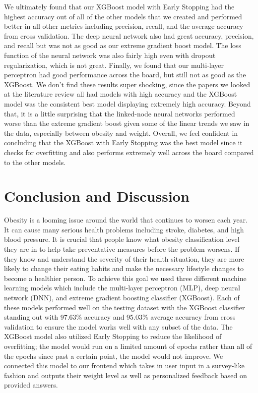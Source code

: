 \documentclass[11pt]{article}
\begin{document}
    We ultimately found that our XGBoost model with Early Stopping had the highest accuracy out of all of the other models that we created and performed better in all other metrics including precision, recall, and the average accuracy from cross validation. The deep neural network also had great accuracy, precision, and recall but was not as good as our extreme gradient boost model. The loss function of the neural network was also fairly high even with dropout regularization, which is not great. Finally, we found that our multi-layer perceptron had good performance across the board, but still not as good as the XGBoost. We don’t find these results super shocking, since the papers we looked at the literature review all had models with high accuracy and the XGBoost model was the consistent best model displaying extremely high accuracy. Beyond that, it is a little surprising that the linked-node neural networks performed worse than the extreme gradient boost given some of the linear trends we saw in the data, especially between obesity and weight. Overall, we feel confident in concluding that the XGBoost with Early Stopping was the best model since it checks for overfitting and also performs extremely well across the board compared to the other models. 
\section{Conclusion and Discussion}
Obesity is a looming issue around the world that continues to worsen each year. It can cause many serious health problems including stroke, diabetes, and high blood pressure. It is crucial that people know what obesity classification level they are in to help take preventative measures before the problem worsens. If they know and understand the severity of their health situation, they are more likely to change their eating habits and make the necessary lifestyle changes to become a healthier person. To achieve this goal we used three different machine learning models which include the multi-layer perceptron (MLP), deep neural network (DNN), and extreme gradient boosting classifier (XGBoost). Each of these models performed well on the testing dataset with the XGBoost classifier standing out with 97.63\% accuracy and 95.03\% average accuracy from cross validation to ensure the model works well with any subset of the data. The XGBoost model also utilized Early Stopping to reduce the likelihood of overfitting; the model would run on a limited amount of epochs rather than all of the epochs since past a certain point, the model would not improve. We connected this model to our frontend which takes in user input in a survey-like fashion and outputs their weight level as well as personalized feedback based on provided answers. 
\end{document}
